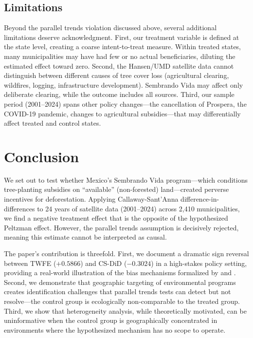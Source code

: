\documentclass[12pt]{article}
\begin{document}
\subsection{Limitations}

Beyond the parallel trends violation discussed above, several additional limitations deserve acknowledgment. First, our treatment variable is defined at the state level, creating a coarse intent-to-treat measure. Within treated states, many municipalities may have had few or no actual beneficiaries, diluting the estimated effect toward zero. Second, the Hansen/UMD satellite data cannot distinguish between different causes of tree cover loss (agricultural clearing, wildfires, logging, infrastructure development). Sembrando Vida may affect only deliberate clearing, while the outcome includes all sources. Third, our sample period (2001--2024) spans other policy changes---the cancellation of Prospera, the COVID-19 pandemic, changes to agricultural subsidies---that may differentially affect treated and control states.


\section{Conclusion}

We set out to test whether Mexico's Sembrando Vida program---which conditions tree-planting subsidies on ``available'' (non-forested) land---created perverse incentives for deforestation. Applying Callaway-Sant'Anna difference-in-differences to 24 years of satellite data (2001--2024) across 2,410 municipalities, we find a negative treatment effect that is the opposite of the hypothesized Peltzman effect. However, the parallel trends assumption is decisively rejected, meaning this estimate cannot be interpreted as causal.

The paper's contribution is threefold. First, we document a dramatic sign reversal between TWFE ($+0.5866$) and CS-DiD ($-0.3024$) in a high-stakes policy setting, providing a real-world illustration of the bias mechanisms formalized by \citet{goodmanbacon2021difference} and \citet{dechaisemartin2020two}. Second, we demonstrate that geographic targeting of environmental programs creates identification challenges that parallel trends tests can detect but not resolve---the control group is ecologically non-comparable to the treated group. Third, we show that heterogeneity analysis, while theoretically motivated, can be uninformative when the control group is geographically concentrated in environments where the hypothesized mechanism has no scope to operate.
\end{document}
